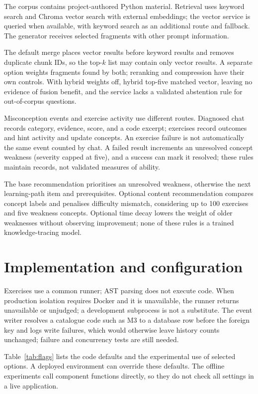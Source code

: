 The corpus contains project-authored Python material. Retrieval uses keyword search and Chroma vector search with external embeddings; the vector service is queried when available, with keyword search as an additional route and fallback. The generator receives selected fragments with other prompt information.

The default merge places vector results before keyword results and removes duplicate chunk IDs, so the top-$k$ list may contain only vector results. A separate option weights fragments found by both; reranking and compression have their own controls. With hybrid weights off, hybrid top-five matched vector, leaving no evidence of fusion benefit, and the service lacks a validated abstention rule for out-of-corpus questions.

Misconception events and exercise activity use different routes. Diagnosed chat records category, evidence, score, and a code excerpt; exercises record outcomes and hint activity and update concepts. An exercise failure is not automatically the same event counted by chat. A failed result increments an unresolved concept weakness (severity capped at five), and a success can mark it resolved; these rules maintain records, not validated measures of ability.

The base recommendation prioritises an unresolved weakness, otherwise the next learning-path item and prerequisites. Optional content recommendation compares concept labels and penalises difficulty mismatch, considering up to 100 exercises and five weakness concepts. Optional time decay lowers the weight of older weaknesses without observing improvement; none of these rules is a trained knowledge-tracing model.

\section{Implementation and configuration}
\label{sec:implementation}
Exercises use a common runner; AST parsing does not execute code. When production isolation requires Docker and it is unavailable, the runner returns unavailable or unjudged; a development subprocess is not a substitute. The event writer resolves a catalogue code such as M3 to a database row before the foreign key and logs write failures, which would otherwise leave history counts unchanged; failure and concurrency tests are still needed.

Table~\ref{tab:flags} lists the code defaults and the experimental use of selected options. A deployed environment can override these defaults. The offline experiments call component functions directly, so they do not check all settings in a live application.

